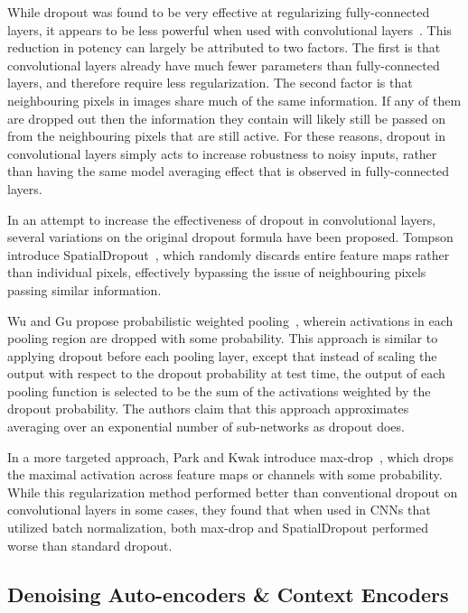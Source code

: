 \documentclass[10pt,twocolumn,letterpaper]{article}
\begin{document}
While dropout was found to be very effective at regularizing fully-connected layers, it appears to be less powerful when used with convolutional layers~\cite{tompson2015efficient}. This reduction in potency can largely be attributed to two factors. The first is that convolutional layers already have much fewer parameters than fully-connected layers, and therefore require less regularization. The second factor is that neighbouring pixels in images share much of the same information. If any of them are dropped out then the information they contain will likely still be passed on from the neighbouring pixels that are still active. For these reasons, dropout in convolutional layers simply acts to increase robustness to noisy inputs, rather than having the same model averaging effect that is observed in fully-connected layers.

In an attempt to increase the effectiveness of dropout in convolutional layers, several variations on the original dropout formula have been proposed. Tompson \etal{} introduce SpatialDropout~\cite{tompson2015efficient}, which randomly discards entire feature maps rather than individual pixels, effectively bypassing the issue of neighbouring pixels passing similar information.

Wu and Gu propose probabilistic weighted pooling~\cite{wu2015towards}, wherein activations in each pooling region are dropped with some probability. This approach is similar to applying dropout before each pooling layer, except that instead of scaling the output with respect to the dropout probability at test time, the output of each pooling function is selected to be the sum of the activations weighted by the dropout probability. The authors claim that this approach approximates averaging over an exponential number of sub-networks as dropout does.

In a more targeted approach, Park and Kwak introduce max-drop~\cite{park2016analysis}, which drops the maximal activation across feature maps or channels with some probability. While this regularization method performed better than conventional dropout on convolutional layers in some cases, they found that when used in CNNs that utilized batch normalization, both max-drop and SpatialDropout performed worse than standard dropout.

\subsection{Denoising Auto-encoders \& Context Encoders}
\end{document}
